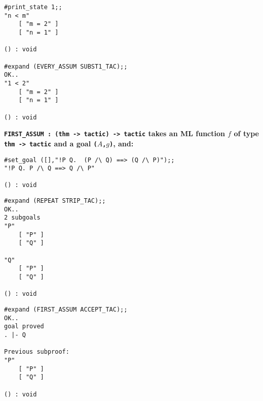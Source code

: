 \vskip4mm
\begin{session}\begin{verbatim}
#print_state 1;;
"n < m"
    [ "m = 2" ]
    [ "n = 1" ]

() : void

#expand (EVERY_ASSUM SUBST1_TAC);;
OK..
"1 < 2"
    [ "m = 2" ]
    [ "n = 1" ]

() : void
\end{verbatim}\end{session}



\vskip5mm
\bspindent\Large\bf\obeylines
\verb!FIRST_ASSUM : (thm -> tactic) -> tactic!
\espindent
\vskip5mm
\bpindent\LARGE\bf
takes an ML function $f$ of type \verb!thm -> tactic! and 
a goal {\tt ($A$,$g$)}, and:
\vskip5mm
\epindent
{}
\vskip7mm
\vskip 4mm
\begin{session}\begin{verbatim}
#set_goal ([],"!P Q.  (P /\ Q) ==> (Q /\ P)");;
"!P Q. P /\ Q ==> Q /\ P"

() : void
\end{verbatim}\end{session}


\vskip4mm
\begin{session}\begin{verbatim}
#expand (REPEAT STRIP_TAC);;
OK..
2 subgoals
"P"
    [ "P" ]
    [ "Q" ]

"Q"
    [ "P" ]
    [ "Q" ]

() : void
\end{verbatim}\end{session}

\vskip4mm
\begin{session}\begin{verbatim}
#expand (FIRST_ASSUM ACCEPT_TAC);;
OK..
goal proved
. |- Q

Previous subproof:
"P"
    [ "P" ]
    [ "Q" ]

() : void
\end{verbatim}\end{session}

